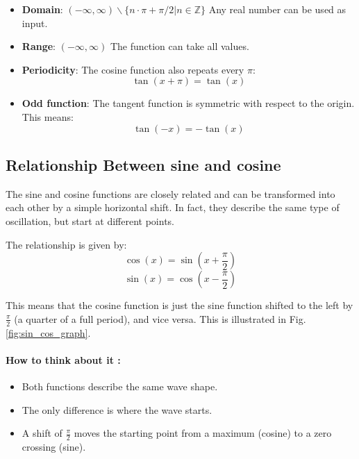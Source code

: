 \begin{itemize}
    \item \textbf{Domain}: $(-\infty, \infty) \backslash \{n\cdot \pi + \pi/2 | n \in \mathbb{Z}\}$  
    Any real number can be used as input.

    \item \textbf{Range}: $(-\infty, \infty)$ 
    The function can take all values.

    \item \textbf{Periodicity}:  
    The cosine function also repeats every $\pi$:
    \begin{equation}
        \tan(x + \pi) = \tan(x)
    \end{equation}
    \item \textbf{Odd function}:  
    The tangent function is symmetric with respect to the origin. This means:
    \begin{equation}
        \tan(-x) = -\tan(x)
    \end{equation}
\end{itemize}

\subsection{Relationship Between sine and cosine}

The sine and cosine functions are closely related and can be transformed into each other by a simple horizontal shift. In fact, they describe the same type of oscillation, but start at different points.

The relationship is given by:
\begin{equation}
    \cos(x) = \sin\left(x + \frac{\pi}{2}\right)
\end{equation}
\begin{equation}
    \sin(x) = \cos\left(x - \frac{\pi}{2}\right)
\end{equation}

This means that the cosine function is just the sine function shifted to the left by $\frac{\pi}{2}$ (a quarter of a full period), and vice versa. This is illustrated in Fig. \ref{fig:sin_cos_graph}.

\paragraph{How to think about it :}
\begin{itemize}
    \item Both functions describe the same wave shape.
    \item The only difference is where the wave starts.
    \item A shift of $\frac{\pi}{2}$ moves the starting point from a maximum (cosine) to a zero crossing (sine).
\end{itemize}

